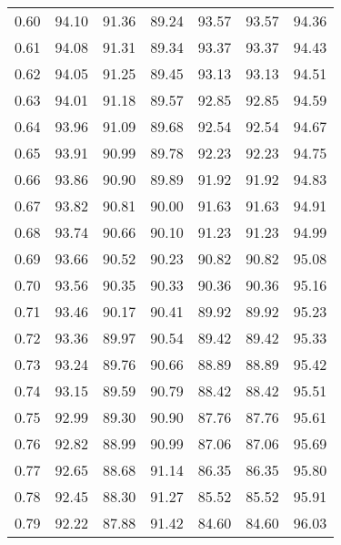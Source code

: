 \begin{tabular}{|c|c|c|c|c|c|c|}
      0.60 &     94.10 &     91.36 &      89.24 &   93.57 &      93.57 &         94.36 \\
      0.61 &     94.08 &     91.31 &      89.34 &   93.37 &      93.37 &         94.43 \\
      0.62 &     94.05 &     91.25 &      89.45 &   93.13 &      93.13 &         94.51 \\
      0.63 &     94.01 &     91.18 &      89.57 &   92.85 &      92.85 &         94.59 \\
      0.64 &     93.96 &     91.09 &      89.68 &   92.54 &      92.54 &         94.67 \\
      0.65 &     93.91 &     90.99 &      89.78 &   92.23 &      92.23 &         94.75 \\
      0.66 &     93.86 &     90.90 &      89.89 &   91.92 &      91.92 &         94.83 \\
      0.67 &     93.82 &     90.81 &      90.00 &   91.63 &      91.63 &         94.91 \\
      0.68 &     93.74 &     90.66 &      90.10 &   91.23 &      91.23 &         94.99 \\
      0.69 &     93.66 &     90.52 &      90.23 &   90.82 &      90.82 &         95.08 \\
      0.70 &     93.56 &     90.35 &      90.33 &   90.36 &      90.36 &         95.16 \\
      0.71 &     93.46 &     90.17 &      90.41 &   89.92 &      89.92 &         95.23 \\
      0.72 &     93.36 &     89.97 &      90.54 &   89.42 &      89.42 &         95.33 \\
      0.73 &     93.24 &     89.76 &      90.66 &   88.89 &      88.89 &         95.42 \\
      0.74 &     93.15 &     89.59 &      90.79 &   88.42 &      88.42 &         95.51 \\
      0.75 &     92.99 &     89.30 &      90.90 &   87.76 &      87.76 &         95.61 \\
      0.76 &     92.82 &     88.99 &      90.99 &   87.06 &      87.06 &         95.69 \\
      0.77 &     92.65 &     88.68 &      91.14 &   86.35 &      86.35 &         95.80 \\
      0.78 &     92.45 &     88.30 &      91.27 &   85.52 &      85.52 &         95.91 \\
      0.79 &     92.22 &     87.88 &      91.42 &   84.60 &      84.60 &         96.03 \\

\end{tabular}
